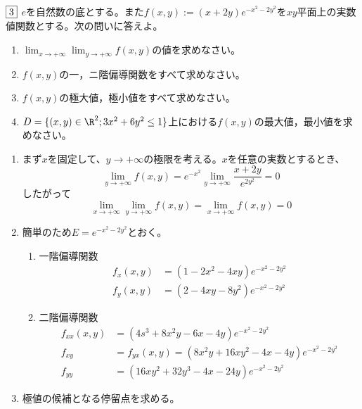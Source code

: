 \begin{tcolorbox} %
	$\fbox{3}$ $e$を自然数の底とする。また$f(x, y):= (x+ 2y)e^{-x^2- 2y^2}$を$xy$平面上の実数値関数とする。次の問いに答えよ。
\begin{enumerate}
	\item $\lim_{x\to +\infty}\lim_{y\to +\infty} f(x, y)$の値を求めなさい。
	\item $f(x, y)$の一，ニ階偏導関数をすべて求めなさい。
	\item $f(x, y)$の極大値，極小値をすべて求めなさい。
	\item $D= \{(x, y)\in \R^2; 3x^2+ 6y^2\le 1\}$上における$f(x, y)$の最大値，最小値を求めなさい。
\end{enumerate}
\end{tcolorbox}

\begin{souanswer} %
\begin{enumerate}
    \item まず$x$を固定して、$y\to +\infty$の極限を考える。$x$を任意の実数とするとき、
\begin{equation*}
    \lim_{y\to +\infty} f(x, y)= e^{-x^2}\lim_{y\to +\infty} \frac{x+ 2y}{e^{2y^2}}= 0
\end{equation*}
    したがって
\begin{equation*}
    \lim_{x\to +\infty}\lim_{y\to +\infty} f(x, y)= \lim_{x\to +\infty} f(x, y)= 0
\end{equation*}
    \item 簡単のため$E= e^{-x^2- 2y^2}$とおく。
\begin{enumerate}
    \item 一階偏導関数
\begin{align*}
    f_x(x, y)&= (1- 2x^2- 4xy)e^{-x^2- 2y^2}\\
    f_y(x, y)&= (2- 4xy- 8y^2)e^{-x^2- 2y^2}
\end{align*}
    \item 二階偏導関数
\begin{align*}
    f_{xx}(x, y)&= (4s^3+ 8x^2y- 6x- 4y)e^{-x^2- 2y^2}\\
    f_{xy}&= f_{yx}(x, y)= (8x^2y+ 16xy^2- 4x- 4y)e^{-x^2- 2y^2}\\
    f_{yy}&= (16xy^2+ 32y^3- 4x- 24y)e^{-x^2- 2y^2}
\end{align*}
\end{enumerate}
    \item 極値の候補となる停留点を求める。
\end{enumerate}
\end{souanswer}
